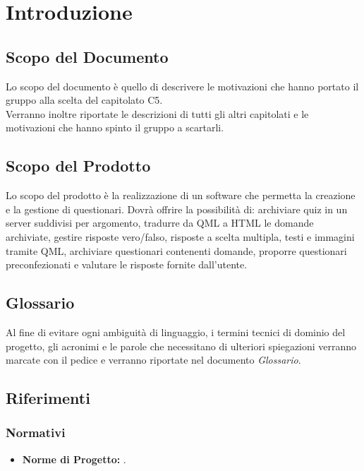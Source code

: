 \newpage
\section{Introduzione}

\subsection{Scopo del Documento}
Lo scopo del documento è quello di descrivere le motivazioni che hanno portato il gruppo alla scelta del capitolato C5. \\ Verranno inoltre riportate le descrizioni di tutti gli altri capitolati e le motivazioni che hanno spinto il gruppo a scartarli.
 
\subsection{Scopo del Prodotto}
Lo scopo del prodotto è la realizzazione di un software che permetta la creazione e la gestione di questionari. Dovrà offrire la possibilità di: archiviare quiz in un server suddivisi per argomento, tradurre da QML a HTML le domande archiviate, gestire risposte vero/falso, risposte a scelta multipla, testi e immagini tramite QML, archiviare questionari contenenti domande, proporre questionari preconfezionati e valutare le risposte fornite dall'utente.

\subsection{Glossario}
Al fine di evitare ogni ambiguità di linguaggio, i termini tecnici di dominio del progetto, gli acronimi e le parole che necessitano di ulteriori spiegazioni verranno marcate con il pedice  e verranno riportate nel documento \textit{Glossario}.

\subsection{Riferimenti}

\subsubsection{Normativi}
\begin{itemize}
\item \textbf{Norme di Progetto:} \NdP.
\end{itemize}

